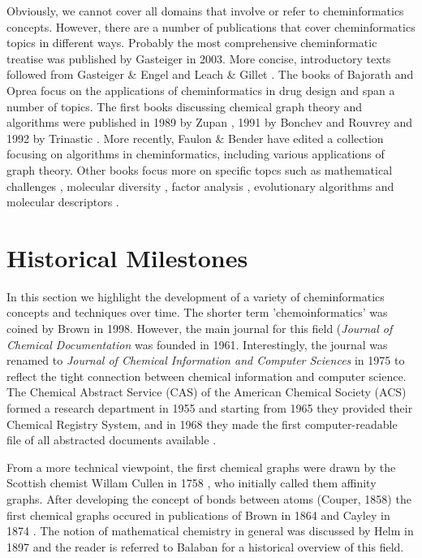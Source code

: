 \documentclass{sig-alternate}
\begin{document}
Obviously, we cannot cover all domains that involve or refer to
cheminformatics concepts. However, there are a number of publications
that cover cheminformatics topics in different ways.  Probably the
most comprehensive cheminformatic treatise was published by Gasteiger
\cite{Gasteiger2003} in 2003.  More concise, introductory texts
followed from Gasteiger \& Engel \cite{gasteigerengel2003} and Leach
\& Gillet \cite{leachgillet2007}.  The books of Bajorath
\cite{Bajorath2004} and Oprea \cite{oprea2005} focus on the
applications of cheminformatics in drug design and span a number of
topics. The first books discussing chemical graph theory and
algorithms were published in 1989 by Zupan \cite{zupan1989}, 1991 by
Bonchev and Rouvrey \cite{bonchevrouvrey1991,bonchevrouvrey2003} and
1992 by Trinastic \cite{Trinajstic1992}.  More recently, Faulon \&
Bender \cite{faulon2010} have edited a collection focusing on
algorithms in cheminformatics, including various applications of graph
theory.  Other books focus more on specific topcs such as mathematical
challenges \cite{mathchallenges1995}, molecular diversity
\cite{moleculardiversity1999}, factor analysis \cite{Malinowski2002},
evolutionary algorithms \cite{clark2000} and molecular descriptors
\cite{todeschini2000}.

\section{Historical Milestones}
In this section we highlight the development of a variety of
cheminformatics concepts and techniques over time. The shorter term
'chemoinformatics' was coined by Brown in
1998\cite{brown1998}. However, the main journal for this field
(\textit{Journal of Chemical Documentation} was founded in
1961. Interestingly, the journal was renamed to \textit{Journal of
  Chemical Information and Computer Sciences} in 1975 to reflect the
tight connection between chemical information and computer
science. The Chemical Abstract Service (CAS) of the American Chemical
Society (ACS) formed a research department in 1955 and starting from
1965 they provided their Chemical Registry System, and in 1968 they
made the first computer-readable file of all abstracted documents
available \cite{Chen2006}.

From a more technical viewpoint, the first chemical graphs were drawn
by the Scottish chemist Willam Cullen in 1758
\cite{bonchevrouvrey1991}, who initially called them affinity graphs.
After developing the concept of bonds between atoms (Couper, 1858) the
first chemical graphs occured in publications of Brown in 1864 and
Cayley in 1874 \cite{bonchevrouvrey1991,brown2009}. The notion of
mathematical chemistry in general was discussed by Helm in 1897
\cite{Helm:1897ys} and the reader is referred to Balaban
\cite{Balaban:2005zr} for a historical overview of this field.
\end{document}
